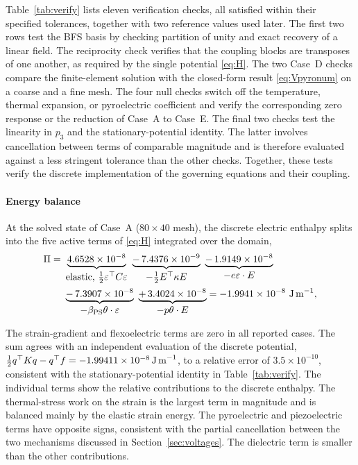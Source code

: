 \documentclass[pdflatex,sn-mathphys-num]{sn-jnl}
\begin{document}
Table~\ref{tab:verify} lists eleven verification checks, all satisfied within their
specified tolerances, together with two reference values used later. The first two
rows test the BFS basis by checking partition of unity and exact recovery of a linear
field. The reciprocity check verifies that the coupling blocks are transposes of one
another, as required by the single potential \eqref{eq:H}. The two Case~D checks
compare the finite-element solution with the closed-form result
\eqref{eq:Vpyronum} on a coarse and a fine mesh. The four null checks switch off the
temperature, thermal expansion, or pyroelectric coefficient and verify the corresponding
zero response or the reduction of Case~A to Case~E. The final two checks test the
linearity in $p_3$ and the stationary-potential identity. The latter involves
cancellation between terms of comparable magnitude and is therefore evaluated against
a less stringent tolerance than the other checks. Together, these tests verify the
discrete implementation of the governing equations and their coupling.

\paragraph{Energy balance}
At the solved state of Case~A ($80\times40$ mesh), the discrete electric enthalpy
splits into the five active terms of \eqref{eq:H} integrated over the domain,
\begin{align}
\Pi=\ &
\underbrace{4.6528\times10^{-8}}_{\mbox{\normalsize elastic, $\tfrac12\varepsilon^\top C\varepsilon$}}
\ \underbrace{-\,7.4376\times10^{-9}}_{\mbox{\normalsize $-\tfrac12E^\top\kappa E$}}
\ \underbrace{-\,1.9149\times10^{-8}}_{\mbox{\normalsize $-e\varepsilon\cdot E$}}
\notag\\
&\underbrace{-\,7.3907\times10^{-8}}_{\mbox{\normalsize $-\beta_{\mathrm{PS}}\theta\cdot\varepsilon$}}
\ \underbrace{+\,3.4024\times10^{-8}}_{\mbox{\normalsize $-p\theta\cdot E$}}
=-1.9941\times10^{-8}\ \text{J\,m}^{-1},
\label{eq:energyaudit}
\end{align}

The strain-gradient and flexoelectric terms are zero in all reported cases. The sum
agrees with an independent evaluation of the discrete potential,
$\tfrac12q^\top Kq-q^\top f=-1.99411\times10^{-8}\,\text{J\,m}^{-1}$, to a relative
error of $3.5\times10^{-10}$, consistent with the stationary-potential identity in
Table~\ref{tab:verify}. The individual terms show the relative contributions to the
discrete enthalpy. The thermal-stress work on the strain is the largest term in
magnitude and is balanced mainly by the elastic strain energy. The pyroelectric and
piezoelectric terms have opposite signs, consistent with the partial cancellation
between the two mechanisms discussed in Section~\ref{sec:voltages}. The dielectric
term is smaller than the other contributions.
\end{document}
